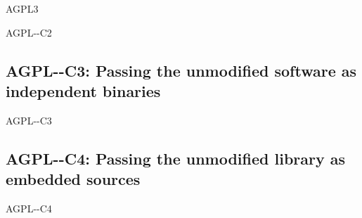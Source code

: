 \begin{license}{AGPL3}
\begin{lsuc}{AGPL-\ver-C2}
  \useCaseTwo

  \begin{lsucrequires}
    \lsucmandatory{\keepLicenseElements}
    \lsucmandatory{\gplthreeEnsureCopyrightNoticeSource}
    \lsucmandatory{\giveLicense}\passingFilesCorrectly
    \lsucmandatory{\retainCopyrightNotices}
    \lsucoptional{\addToDocumentation}
  \end{lsucrequires}

  \begin{lsucprohibits}
    \lsucitem{\noPatentLitigation}
  \end{lsucprohibits}
\end{lsuc}

\subsection{AGPL-\ver-C3: Passing the unmodified software as independent binaries} 
\begin{lsuc}{AGPL-\ver-C3}

  \useCaseThree

  \begin{lsucrequires}
    \lsucmandatory{\keepLicenseElements}
    \lsucmandatory{\gplthreeEnsureCopyrightNoticeBinary}
    \lsucmandatory{\giveLicense}\passingFilesCorrectly  
    \lsucmandatory{\makeUnmodifiedSourceAvailable}
    \lsucmandatory{\describeHowToGetSource}
    \lsucmandatory{\retainCopyrightNotices}
    \lsucoptional{\addToDocumentation}
  \end{lsucrequires}

  \begin{lsucprohibits}
    \lsucitem{\noPatentLitigation}
  \end{lsucprohibits}
\end{lsuc}

\subsection{AGPL-\ver-C4: Passing the unmodified library as embedded sources}
\begin{lsuc}{AGPL-\ver-C4}

  \useCaseFour

  \begin{lsucrequires}
    \lsucmandatory{\keepLicenseElements}
    \lsucmandatory{\gplthreeEnsureCopyrightNoticeSource}
    \lsucmandatory{\giveLicense}\passingFilesCorrectly
    \lsucmandatory{\retainCopyrightNotices}
    \lsucmandatory{\addToCopyrightDialogLib}
    \lsucmandatory{\arrangeEnclosingSources}
    \lsucoptional{\addToDocumentation}
  \end{lsucrequires}


\end{lsuc}
\end{license}

